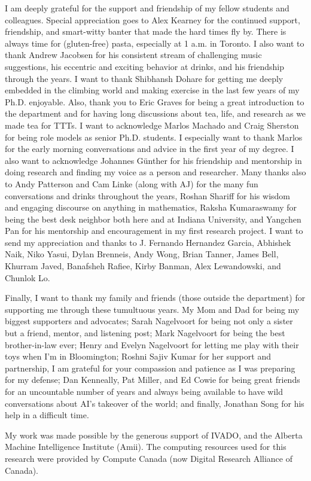 \documentclass[\main/thesis.tex]{subfiles}
\begin{document}
\begin{acknowledgements}
I am deeply grateful for the support and friendship of my fellow students and colleagues. Special appreciation goes to Alex Kearney for the continued support, friendship, and smart-witty banter that made the hard times fly by. There is always time for (gluten-free) pasta, especially at 1 a.m. in Toronto. I also want to thank Andrew Jacobsen for his consistent stream of challenging music suggestions, his eccentric and exciting behavior at drinks, and his friendship through the years. I want to thank Shibhansh Dohare for getting me deeply embedded in the climbing world and making exercise in the last few years of my Ph.D. enjoyable. Also, thank you to Eric Graves for being a great introduction to the department and for having long discussions about tea, life, and research as we made tea for TTTs. I want to acknowledge Marlos Machado and Craig Sherston for being role models as senior Ph.D. students. I especially want to thank Marlos for the early morning conversations and advice in the first year of my degree. I also want to acknowledge Johannes G\"unther for his friendship and mentorship in doing research and finding my voice as a person and researcher. Many thanks also to Andy Patterson and Cam Linke (along with AJ) for the many fun conversations and drinks throughout the years, Roshan Shariff for his wisdom and engaging discourse on anything in mathematics, Raksha Kumaraswamy for being the best desk neighbor both here and at Indiana University, and Yangchen Pan for his mentorship and encouragement in my first research project. I want to send my appreciation and thanks to J. Fernando Hernandez Garcia, Abhishek Naik, Niko Yasui, Dylan Brenneis, Andy Wong, Brian Tanner, James Bell, Khurram Javed, Banafsheh Rafiee, Kirby Banman, Alex Lewandowski, and Chunlok Lo.
  
Finally, I want to thank my family and friends (those outside the department) for supporting me through these tumultuous years. My Mom and Dad for being my biggest supporters and advocates; Sarah Nagelvoort for being not only a sister but a friend, mentor, and listening post; Mark Nagelvoort for being the best brother-in-law ever; Henry and Evelyn Nagelvoort for letting me play with their toys when I'm in Bloomington; Roshni Sajiv Kumar for her support and partnership, I am grateful for your compassion and patience as I was preparing for my defense; Dan Kenneally, Pat Miller, and Ed Cowie for being great friends for an uncountable number of years and always being available to have wild conversations about AI's takeover of the world; and finally, Jonathan Song for his help in a difficult time.

My work was made possible by the generous support of IVADO, and the Alberta Machine Intelligence Institute (Amii). The computing resources used for this research were provided by Compute Canada (now Digital Research Alliance of Canada).

\end{acknowledgements}
\end{document}
